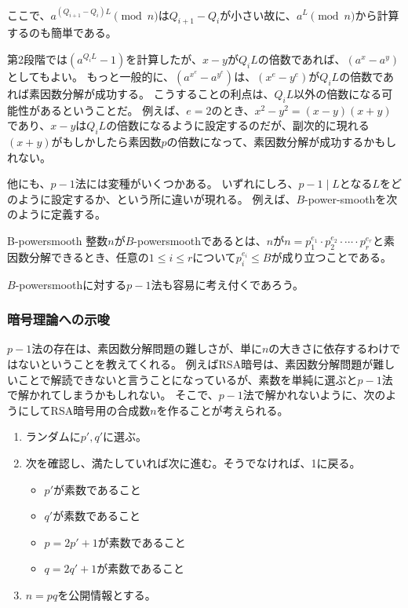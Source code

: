 ここで、$a^{(Q_{i+1}-Q_i)L}\pmod{n}$は$Q_{i+1}-Q_i$が小さい故に、$a^L\pmod{n}$から計算するのも簡単である。


第2段階では$(a^{Q_iL}-1)$を計算したが、$x-y$が$Q_iL$の倍数であれば、$(a^x - a^y)$としてもよい。
もっと一般的に、$(a^{x^e}-a^{y^e})$は、$(x^e-y^e)$が$Q_iL$の倍数であれば素因数分解が成功する。
こうすることの利点は、$Q_iL$以外の倍数になる可能性があるということだ。
例えば、$e=2$のとき、$x^2-y^2=(x-y)(x+y)$であり、$x-y$は$Q_iL$の倍数になるように設定するのだが、副次的に現れる$(x+y)$がもしかしたら素因数$p$の倍数になって、素因数分解が成功するかもしれない。

他にも、$p-1$法には変種がいくつかある。
いずれにしろ、$p-1\mid L$となる$L$をどのように設定するか、という所に違いが現れる。
例えば、$B$-power-smoothを次のように定義する。

\begin{Defi}{}{B-powersmooth}
整数$n$が$B$-powersmoothであるとは、$n$が$n=p_1^{e_1}\cdot p_2^{e_2}\cdot\cdots\cdot p_r^{e_r}$と素因数分解できるとき、任意の$1\le i\le r$について$p_i^{e_i}\le B$が成り立つことである。
\end{Defi}

$B$-powersmoothに対する$p-1$法も容易に考え付くであろう。

\subsubsection{暗号理論への示唆}
$p-1$法の存在は、素因数分解問題の難しさが、単に$n$の大きさに依存するわけではないということを教えてくれる。
例えばRSA暗号は、素因数分解問題が難しいことで解読できないと言うことになっているが、素数を単純に選ぶと$p-1$法で解かれてしまうかもしれない。
そこで、$p-1$法で解かれないように、次のようにしてRSA暗号用の合成数$n$を作ることが考えられる。
\begin{enumerate}
\item ランダムに$p', q'$に選ぶ。
\item 次を確認し、満たしていれば次に進む。そうでなければ、1に戻る。
 \begin{itemize}
 \item $p'$が素数であること
 \item $q'$が素数であること
 \item $p = 2p' + 1$が素数であること
 \item $q = 2q' + 1$が素数であること
 \end{itemize}
\item $n=pq$を公開情報とする。
\end{enumerate}

